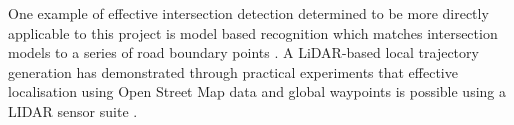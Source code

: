 \documentclass[]{aiaa-tc}%
\begin{document}
One example of effective intersection detection determined to be more directly applicable to this project is model based recognition which matches intersection models to a series of road boundary points \citep{modelBasedIntersection}.
A LiDAR-based local trajectory generation has demonstrated through practical experiments that effective localisation using Open Street Map data and global waypoints is possible using a LIDAR sensor suite \cite{mitLocalNavDriving}. 


%
%
%
%
%
\end{document}
